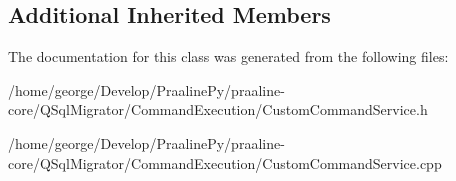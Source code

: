 \subsection*{Additional Inherited Members}


The documentation for this class was generated from the following files\+:\begin{DoxyCompactItemize}
\item 
/home/george/\+Develop/\+Praaline\+Py/praaline-\/core/\+Q\+Sql\+Migrator/\+Command\+Execution/Custom\+Command\+Service.\+h\item 
/home/george/\+Develop/\+Praaline\+Py/praaline-\/core/\+Q\+Sql\+Migrator/\+Command\+Execution/Custom\+Command\+Service.\+cpp\end{DoxyCompactItemize}
